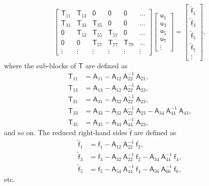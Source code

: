 \documentclass[10pt,a4paper]{amsart}
\newcommand{\vct}[1]{\bm{\mathsf{#1}}}
\newcommand{\mtx}[1]{\bm{\mathsf{#1}}}
\begin{document}
\begin{equation}
\label{eq:dell3}
\begin{bmatrix}
\mtx T_{11} & \mtx T_{13} & \mtx 0 & \mtx 0 & \mtx 0 & \dots \\
\mtx T_{31} & \mtx T_{33} & \mtx T_{35} & \mtx 0 &  \mtx 0 & \dots \\
\mtx 0 & \mtx T_{53} & \mtx T_{55} & \mtx T_{57} &   \mtx 0 & \dots\\
\mtx{0} & \mtx 0 & \mtx T_{57} & \mtx T_{77} & \mtx T_{79} & \dots\\
\vdots & \vdots & \vdots & \vdots & \vdots & \vdots
\end{bmatrix}
\begin{bmatrix} \mtx u_1\\\mtx u_3\\ \mtx u_5 \\ \mtx u_7 \\ \vdots \end{bmatrix} =
\begin{bmatrix} \tilde{\vct{f}}_{1} \\ \tilde{\vct{f}}_{3} \\\tilde{\vct{f}}_{5} \\ \tilde{\mtx f}_7\\ \vdots \end{bmatrix},
\end{equation}
where the sub-blocks of $\mtx T$ are defined as
\begin{align}
\label{eq:T11}
\mtx{T}_{11} &= \mtx A_{11} - \mtx{A}_{ 12}\ \mtx{A}_{ 22}^{-1}\ \mtx{A}_{ 21}, \\
\label{eq:T13}
\mtx{T}_{13} &= \mtx A_{13} - \mtx{A}_{ 12}\ \mtx{A}_{ 22}^{-1}\ \mtx{A}_{ 23}, \\
\label{eq:T31}
\mtx{T}_{31} &= \mtx A_{31} - \mtx{A}_{ 32}\ \mtx{A}_{ 22}^{-1}\ \mtx{A}_{ 23}, \\
\label{eq:T33}
\mtx{T}_{33} &= \mtx A_{33} - \mtx{A}_{ 32}\ \mtx{A}_{ 22}^{-1}\ \mtx{A}_{ 23}
                              - \mtx{A}_{ 34}\ \mtx{A}_{ 44}^{-1}\ \mtx{A}_{ 43}, \\
\label{eq:T35}
\mtx{T}_{35} &= \mtx A_{35} - \mtx{A}_{ 34}\ \mtx{A}_{ 44}^{-1}\ \mtx{A}_{ 23},
\end{align}
and so on. The reduced right-hand sides $\mtx{\tilde f}$ are defined as
\begin{align}
\label{eq:f1}
\mtx{\tilde f}_{ 1} &= \mtx f_{ 1} - \mtx{A}_{ 12}\ \mtx{A}_{22}^{-1}\ \mtx f_2, \\
\label{eq:f3}
\mtx{\tilde f}_{ 3} &= \mtx f_{ 3} - \mtx{A}_{ 32}\ \mtx{A}_{22}^{-1}\ \mtx f_2 
                                   - \mtx{A}_{ 34}\ \mtx{A}_{44}^{-1}\ \mtx f_4, \\
\label{eq:f5}
\mtx{\tilde f}_{ 5} &= \mtx f_{ 5} - \mtx{A}_{ 54}\ \mtx{A}_{44}^{-1}\ \mtx f_4
                                   - \mtx{A}_{ 56}\ \mtx{A}_{66}^{-1}\ \mtx f_6,
\end{align}
etc.
\end{document}
